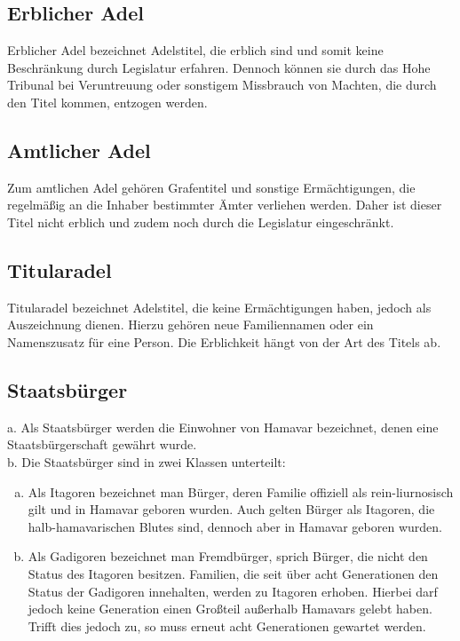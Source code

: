 \documentclass{article}
\begin{document}
\subsection{Erblicher Adel}
Erblicher Adel bezeichnet Adelstitel, die erblich sind und somit keine Beschränkung durch Legislatur erfahren. Dennoch können sie durch das Hohe Tribunal bei Veruntreuung oder sonstigem Missbrauch von Machten, die durch den Titel kommen, entzogen werden.  

\subsection{Amtlicher Adel}
Zum amtlichen Adel gehören Grafentitel und sonstige Ermächtigungen, die regelmäßig an die Inhaber bestimmter Ämter verliehen werden. Daher ist dieser Titel nicht erblich und zudem noch durch die Legislatur eingeschränkt.  

\subsection{Titularadel}
Titularadel bezeichnet Adelstitel, die keine Ermächtigungen haben, jedoch als Auszeichnung dienen. Hierzu gehören neue Familiennamen oder ein Namenszusatz für eine Person. Die Erblichkeit hängt von der Art des Titels ab.  

\subsection{Staatsbürger}
a. Als Staatsbürger werden die Einwohner von Hamavar bezeichnet, denen eine Staatsbürgerschaft gewährt wurde. \\  
b. Die Staatsbürger sind in zwei Klassen unterteilt:  \\
\begin{enumerate}[a)]
\item Als Itagoren bezeichnet man Bürger, deren Familie offiziell als rein-liurnosisch gilt und in Hamavar geboren wurden. Auch gelten Bürger als Itagoren, die halb-hamavarischen Blutes sind, dennoch aber in Hamavar geboren wurden.  
\item Als Gadigoren bezeichnet man Fremdbürger, sprich Bürger, die nicht den Status des Itagoren besitzen. Familien, die seit über acht Generationen den Status der Gadigoren innehalten, werden zu Itagoren erhoben. Hierbei darf jedoch keine Generation einen Großteil außerhalb Hamavars gelebt haben. Trifft dies jedoch zu, so muss erneut acht Generationen gewartet werden.  
\end{enumerate}
\end{document}
